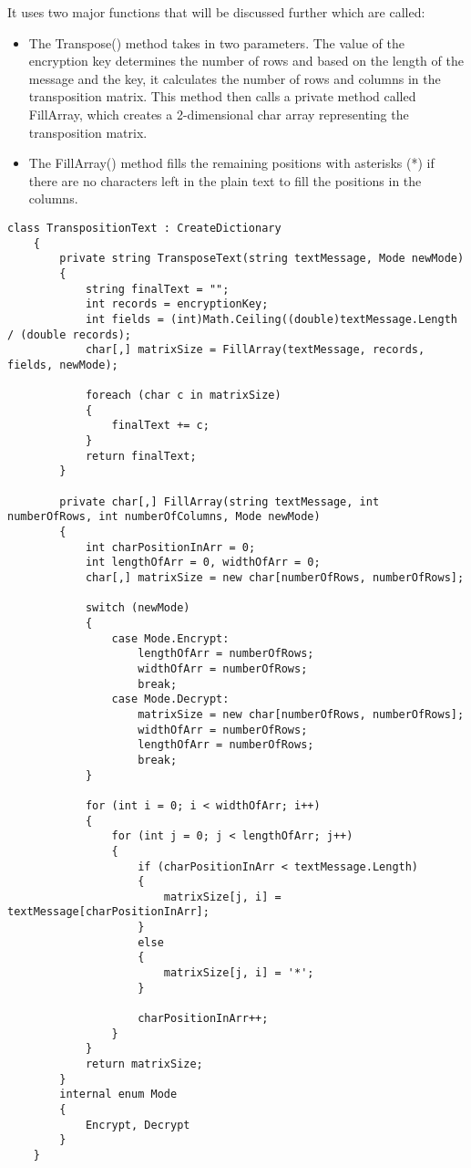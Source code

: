 It uses two major functions that will be discussed further which are called: 
\begin{itemize}
    \item The Transpose() method takes in two parameters. The value of the encryption key determines the number of rows and based on the length of the message and the key, it calculates the number of rows and columns in the transposition matrix. This method then calls a private method called FillArray, which creates a 2-dimensional char array representing the transposition matrix. 
    \item The FillArray() method fills the remaining positions with asterisks (*) if there are no characters left in the plain text to fill the positions in the columns.
\end{itemize}

\begin{lstlisting}[caption=Transposition Cipher Text Source Code]
class TranspositionText : CreateDictionary
    {
        private string TransposeText(string textMessage, Mode newMode) 
        {
            string finalText = "";
            int records = encryptionKey;
            int fields = (int)Math.Ceiling((double)textMessage.Length / (double records);
            char[,] matrixSize = FillArray(textMessage, records, fields, newMode);
            
            foreach (char c in matrixSize)
            {
                finalText += c;
            }
            return finalText;
        }

        private char[,] FillArray(string textMessage, int numberOfRows, int numberOfColumns, Mode newMode) 
        {
            int charPositionInArr = 0; 
            int lengthOfArr = 0, widthOfArr = 0; 
            char[,] matrixSize = new char[numberOfRows, numberOfRows]; 

            switch (newMode)
            {
                case Mode.Encrypt:
                    lengthOfArr = numberOfRows;
                    widthOfArr = numberOfRows;
                    break;
                case Mode.Decrypt: 
                    matrixSize = new char[numberOfRows, numberOfRows];
                    widthOfArr = numberOfRows;
                    lengthOfArr = numberOfRows;
                    break;
            }

            for (int i = 0; i < widthOfArr; i++)
            {
                for (int j = 0; j < lengthOfArr; j++)
                {
                    if (charPositionInArr < textMessage.Length)
                    {
                        matrixSize[j, i] = textMessage[charPositionInArr]; 
                    }
                    else
                    {
                        matrixSize[j, i] = '*'; 
                    }

                    charPositionInArr++;
                }
            }
            return matrixSize; 
        }
        internal enum Mode 
        {
            Encrypt, Decrypt
        }
    }
\end{lstlisting}

